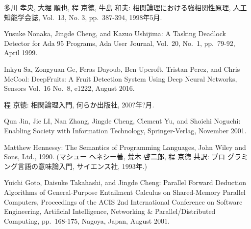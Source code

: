 \documentclass[12pt,epsf]{jreport}
\begin{document}
\begin{thebibliography}{99}
\label{sannkoubunnkenn_chapter}

%


多川 孝央, 大堀 順也, 程 京徳, 牛島 和夫: 相関論理における強相関性原理,
        人工知能学会誌, Vol.\ 13, No. 3, pp.\ 387-394, 1998年5月.

Yusuke Nonaka, Jingde Cheng, and Kazuo Ushijima: A Tasking Deadlock
        Detector for Ada 95 Programs, Ada User Journal, Vol.\ 20, No.\ 1,
        pp.\ 79-92, April 1999.

        Inkyu Sa, Zongyuan Ge, Feras Dayoub, Ben Upcroft, Tristan Perez, and Chris McCool: DeepFruits: A Fruit Detection System Using Deep Neural Networks, Sensors Vol.\ 16 No.\ 8, e1222, August 2016.

        
程 京徳: 相関論理入門, 何らか出版社, 200?年?月.

Qun Jin, Jie LI, Nan Zhang, Jingde Cheng, Clement Yu, and Shoichi
        Noguchi: Enabling Society with Information Technology,
        Springer-Verlag, November 2001.

Matthew Hennessy: The Semantics of Programming Languages, John Wiley and
Sons, Ltd., 1990. (マシュー ヘネシー著, 荒木 啓二郎, 程 京徳 共訳: プロ
グラミング言語の意味論入門, サイエンス社, 1993年.)

Yuichi Goto, Daisuke Takahashi, and Jingde Cheng: Parallel Forward
        Deduction Algorithms of General-Purpose Entailment Calculus on
        Shared-Memory Parallel Computers, Proceedings of the ACIS 2nd
        International Conference on Software Engineering, Artificial
        Intelligence, Networking \& Parallel/Distributed Computing,
        pp.\ 168-175, Nagoya, Japan, August 2001.


\end{thebibliography}
\end{document}
